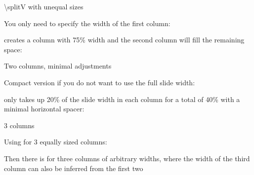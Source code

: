 \documentclass[11pt,compress,t,notes=noshow, xcolor=table]{beamer}
\begin{document}
\begin{frame}{\textbackslash splitV with unequal sizes}
  
  You only need to specify the width of the first column:
  
  \vfill
  
   creates a column with 75\% width and the
  second column will fill the remaining space:
  
  \vfill
  
  
  \vfill
  
  
\end{frame}


\begin{frame}{Two columns, minimal adjustments}
  
  Compact version if you do not want to use the full slide width:
  
   only takes up 20\% of the slide width in each column for a total of 40\% with a minimal horizontal spacer:
  
  \vfill
  
  
  
\end{frame}


\begin{frame}{3 columns}
  
  Using  for 3 equally sized columns:
  
  \vfill
  
  
  \vfill
  
  Then there is  for three columns of
  arbitrary widths, where the width of the third column can also be inferred from the first two
  \vfill
  
  
\end{frame}
\end{document}
